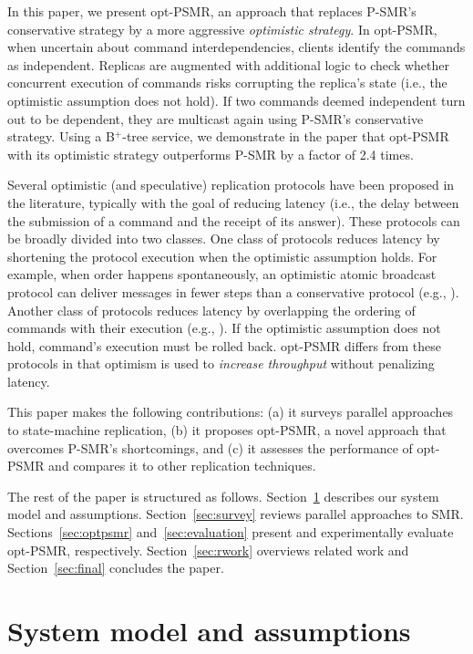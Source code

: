 \documentclass[conference]{IEEEtran}
\begin{document}
In this paper, we present opt-PSMR, an approach that 
replaces P-SMR's conservative strategy by a more aggressive \emph{optimistic strategy}.
In opt-PSMR, when uncertain about command interdependencies, clients identify the commands as independent. 
Replicas are augmented with additional logic to check whether concurrent execution of commands risks corrupting the replica's state (i.e., the optimistic assumption does not hold). 
If two commands deemed independent turn out to be dependent, they are multicast again using P-SMR's conservative strategy. 
Using a B$^+$-tree service, we demonstrate in the paper that opt-PSMR with its optimistic strategy outperforms P-SMR by a factor of 2.4 times. 

Several optimistic (and speculative) replication protocols have been proposed in the literature, typically with the goal of reducing latency (i.e., the delay between the submission of a command and the receipt of its answer).
These protocols can be broadly divided into two classes.
One class of protocols reduces latency by shortening the protocol execution when the optimistic assumption holds.
For example, when order happens spontaneously, an optimistic atomic broadcast protocol can deliver messages in fewer steps than a conservative protocol (e.g., \cite{PS98,Lam06,SousaPMO02}).
Another class of protocols reduces latency by overlapping the ordering of commands with their execution (e.g., \cite{JPPM02, KPAS99, marandi2011high}).
If the optimistic assumption does not hold, command's execution must be rolled back.
opt-PSMR differs from these protocols in that optimism is used to \emph{increase throughput} without penalizing latency.



This paper makes the following contributions: (a) it surveys parallel approaches to state-machine replication, (b) it proposes opt-PSMR, a novel approach that overcomes P-SMR's shortcomings, and (c) it assesses the performance of opt-PSMR and compares it to other replication techniques. 

The rest of the paper is structured as follows. 
Section~\ref{sec:model} describes our system model and assumptions. 
Section~\ref{sec:survey} reviews parallel approaches to SMR. 
Sections~\ref{sec:optpsmr} and~\ref{sec:evaluation} present and experimentally evaluate opt-PSMR, respectively. 
Section~\ref{sec:rwork} overviews related work and Section~\ref{sec:final} concludes the paper.

\section{System model and assumptions}
\label{sec:model}
\end{document}
